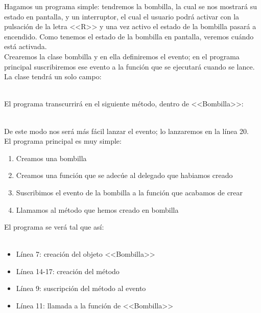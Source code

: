 \documentclass[11pt, oneside]{book}		%
\begin{document}
Hagamos un programa simple: tendremos la bombilla, la cual se nos mostrará su estado en pantalla, y un interruptor, el cual el usuario podrá activar con la pulsación de la letra <<R>> y una vez activo el estado de la bombilla pasará a encendido. Como tenemos el estado de la bombilla en pantalla, veremos cuándo está activada.\\
Crearemos la clase bombilla y en ella definiremos el evento; en el programa principal suscribiremos ese evento a la función que se ejecutará cuando se lance. La clase tendrá un solo campo:
\\\\\begin{minipage}[c]{0.95\textwidth}
	
\end{minipage}
El programa transcurrirá en el siguiente método, dentro de <<Bombilla>>:
\\\\\begin{minipage}[c]{0.95\textwidth}
	
\end{minipage}
De este modo nos será más fácil lanzar el evento; lo lanzaremos en la línea 20.\\
El programa principal es muy simple: 
\begin{enumerate}
	\item Creamos una bombilla
	\item Creamos una función que se adecúe al delegado que habiamos creado
	\item Suscribimos el evento de la bombilla a la función que acabamos de crear
	\item Llamamos al método que hemos creado en bombilla
\end{enumerate}
El programa se verá tal que así:
\\\\\begin{minipage}[c]{0.95\textwidth}
	
\end{minipage}
\begin{itemize}
	\item Línea 7: creación del objeto <<Bombilla>>
	\item Línea 14-17: creación del método
	\item Línea 9: suscripción del método al evento
	\item Línea 11: llamada a la función de <<Bombilla>>
\end{itemize}
\end{document}
